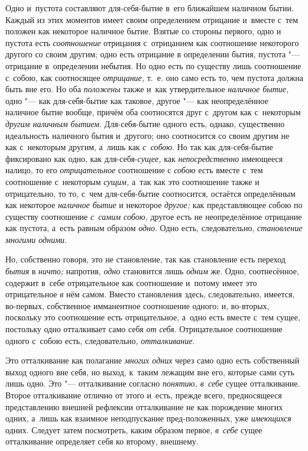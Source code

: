 Одно и~пустота составляют для-себя-бытие в~его ближайшем наличном бытии.
Каждый из этих моментов имеет своим определением отрицание и~вместе с~тем
положен как некоторое наличное бытие. Взятые со стороны первого, одно и
пустота есть {\em соотношение} отрицания с~отрицанием
как соотношение некоторого другого со своим другим; одно есть отрицание в
определении бытия, пустота "--- отрицание в~определении небытия. Но одно есть
по существу лишь соотношение с~собою, как соотносящее
{\em отрицание,} т.~е. оно само есть то, чем пустота
должна быть вне его. Но оба {\em положены} также и~как
утвердительное {\em наличное бытие,} одно "--- как
для-себя-бытие как таковое, другое "--- как неопределённое наличное бытие
вообще, причём оба соотносятся друг с~другом как с~некоторым
{\em другим наличным бытием}. Для-себя-бытие одного
есть, однако, существенно идеальность наличного бытия и~другого; оно
соотносится со своим другим не как с~некоторым другим, а~лишь как
{\em с~собою}. Но так как для-себя-бытие фиксировано
как одно, как для-себя-{\em сущее,} как
{\em непосредственно} имеющееся налицо, то его
{\em отрицательное} соотношение с
{\em собою} есть вместе с~тем соотношение с~некоторым
{\em сущим,} а~так как это соотношение также и
отрицательно, то то, с~чем для-себя-бытие соотносится, остаётся
определённым как некоторое {\em наличное бытие} и
некоторое {\em другое;} как представляющее собою по
существу соотношение {\em с~самим собою,} другое есть
не неопределённое отрицание как пустота, а~есть равным образом
{\em одно}. Одно есть, следовательно, {\em становление многими одними}.

Но, собственно говоря, это не становление, так как становление есть переход
{\em бытия} в {\em ничто;} напротив, {\em одно} становится лишь
{\em одним} же. Одно, соотнесённое, содержит в~себе
отрицательное как соотношение и~потому имеет это отрицательное
{\em в} нём самом. Вместо становления здесь,
следовательно, имеется, во-первых, собственное имманентное соотношение
одного; и, во-вторых, поскольку это соотношение есть отрицательное, а~одно
есть вместе с~тем сущее, постольку одно отталкивает само себя
{\em от себя}. Отрицательное соотношение одного с~собою
есть, следовательно, {\em отталкивание}.

Это отталкивание как полагание {\em многих одних} через
само одно есть собственный выход одного вне себя, но выход, к~таким лежащим
вне его, которые сами суть лишь одно. Это "--- отталкивание согласно
{\em понятию, в~себе} сущее
отталкивание. Второе отталкивание отлично от этого и~есть, прежде всего,
предносящееся представлению внешней рефлексии отталкивание не как
порождение многих одних, а~лишь как взаимное неподпускание пред-положенных,
уже {\em имеющихся} одних. Следует затем посмотреть,
каким образом первое, {\em в~себе} сущее отталкивание
определяет себя ко второму, внешнему.

